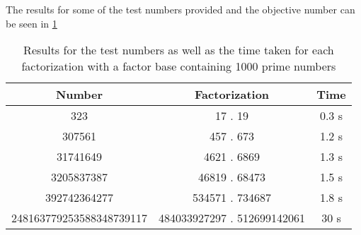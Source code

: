 \documentclass{article}
\begin{document}
The results for some of the test numbers provided and the objective number can be seen in \ref{tab:results}

\begin{table}[h]
    \centering
    \begin{tabular}{|c|c|c|}
    \hline
        Number       & Factorization   & Time       \\ \hline \hline
        323          & 17 . 19         & 0.3 s     \\ \hline
        307561       & 457 . 673       & 1.2 s     \\ \hline
        31741649     & 4621 . 6869     & 1.3 s     \\ \hline
        3205837387   & 46819 . 68473   & 1.5 s     \\ \hline
        392742364277 & 534571 . 734687 & 1.8 s     \\ \hline
        248163779253588348739117 & 484033927297 . 512699142061 & 30 s           \\
    \hline
    \end{tabular}
    \caption{Results for the test numbers as well as the time taken for each factorization with a factor base containing 1000 prime numbers}
    \label{tab:results}
\end{table}
\end{document}
